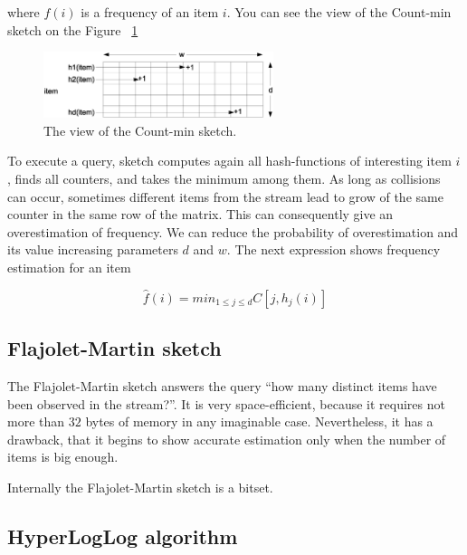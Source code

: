 where $f(i)$ is a frequency of an item $i$.
You can see the view of the Count-min sketch on the Figure ~\ref{fig:count_min_sketch}

\begin{figure}[H]
  \centering
  \includegraphics [width=0.6\textwidth]{images/CountMinSketch}
  \caption{The view of the Count-min sketch.}
  \label{fig:count_min_sketch}
\end{figure}

To execute a query, sketch computes again all hash-functions of interesting item $i$, finds all counters, and takes the minimum among them.
As long as collisions can occur, sometimes different items from the stream lead to grow of the same counter in the same row of the matrix.
This can consequently give an overestimation of frequency.
We can reduce the probability of overestimation and its value increasing parameters $d$ and $w$.
The next expression shows frequency estimation for an item

$$
\hat{f}(i) = min_{1 \leq j \leq d}C[j,h_j(i)]
$$

\subsection{Flajolet-Martin sketch}

The Flajolet-Martin sketch answers the query ``how many distinct items have been observed in the stream?''.
It is very space-efficient, because it requires not more than $32$ bytes of memory in any imaginable case.
Nevertheless, it has a drawback, that it begins to show accurate estimation only when the number of items is big enough.

Internally the Flajolet-Martin sketch is a bitset.

\subsection{HyperLogLog algorithm}








